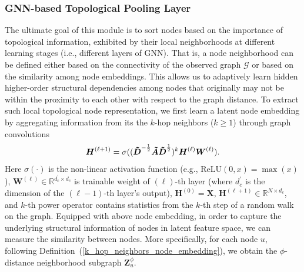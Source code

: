 \documentclass[letterpaper]{article} %
\begin{document}
\subsubsection{GNN-based Topological Pooling Layer}
The ultimate goal of this module is to sort nodes based on the importance of topological information, exhibited by their local neighborhoods at different learning stages (i.e., different layers of GNN). That is, a node neighborhood can be defined either based on the connectivity of the observed graph $\mathcal{G}$ or based on the similarity among node embeddings. This allows us to adaptively learn hidden higher-order structural dependencies among nodes that originally may not be within the proximity to each other with respect to the graph distance. %
To extract such local topological node representation, we first learn
a latent node embedding by aggregating information from its the $k$-hop neighbors ($k \geq 1$) through graph convolutions
\begin{align}
\label{GNN_eq}
{\boldsymbol{H}^{(\ell +1)}} = \sigma((\boldsymbol{\Tilde{D}}^{-\frac{1}{2}}\boldsymbol{\Tilde{A}}\boldsymbol{\Tilde{D}}^{\frac{1}{2}})^k\boldsymbol{H}^{(\ell)}\boldsymbol{W}^{(\ell)}).
\end{align}
Here $\sigma(\cdot)$ is the non-linear activation function (e.g., $\text{ReLU}(0, x) = \max{(x)}$), $\boldsymbol{W}^{(\ell)} \in \mathbb{R}^{d^\prime_c\times d_c}$ is trainable weight of $(\ell)$-th layer (where $d^\prime_c$ is the dimension of the $(\ell-1)$-th layer's output), $\boldsymbol{H}^{(0)} = \boldsymbol{X}$, $\boldsymbol{H}^{(\ell+1)} \in \mathbb{R}^{N \times d_c}$, and $k$-th power operator contains statistics from the $k$-th step of a random walk on the graph. %
Equipped with above node embedding, in order to capture the underlying structural information of nodes in latent feature space, we can measure the similarity between nodes. More specifically, for each node $u$, following Definition~(\ref{k_hop_neighbors_node_embedding}), we obtain the $\phi$-distance neighborhood subgraph $\boldsymbol{Z}^\phi_{u}$.
\end{document}
